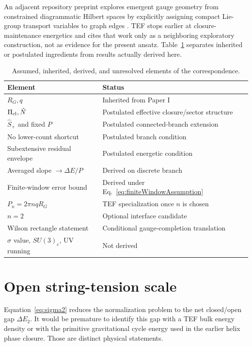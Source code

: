\documentclass[10pt]{article}
\begin{document}
An adjacent repository preprint explores emergent gauge geometry from constrained diagrammatic Hilbert spaces by explicitly assigning compact Lie-group transport variables to graph edges \cite{Arneth2026}. TEF stops earlier at closure-maintenance energetics and cites that work only as a neighboring exploratory construction, not as evidence for the present ansatz. Table~\ref{tab:status} separates inherited or postulated ingredients from results actually derived here.

\begin{table}[t]
\centering
\caption{Assumed, inherited, derived, and unresolved elements of the correspondence.}
\label{tab:status}
\begin{tabular}{@{}>{\raggedright\arraybackslash}p{}>{\raggedright\arraybackslash}p{}@{}}
\toprule
Element & Status \\
\midrule
$R_G,q$ & Inherited from Paper I \\
$\Pi_{\rm cl},\hat N$ & Postulated effective closure/sector structure \\
$\hat S_+$ and fixed $P$ & Postulated connected-branch extension \\
No lower-count shortcut & Postulated branch condition \\
Subextensive residual envelope & Postulated energetic condition \\
Averaged slope $\to\Delta E/P$ & Derived on discrete branch \\
Finite-window error bound & Derived under Eq.~\eqref{eq:finiteWindowAssumption} \\
$P_n=2\pi nqR_G$ & TEF specialization once $n$ is chosen \\
$n=2$ & Optional interface candidate \\
Wilson rectangle statement & Conditional gauge-completion translation \\
$\sigma$ value, $SU(3)_c$, UV running & Not derived \\
\bottomrule
\end{tabular}
\end{table}

\section{Open string-tension scale}
\label{sec:sigma}

Equation~\eqref{eq:sigma2} reduces the normalization problem to the net closed/open gap $\Delta E_2$.  It would be premature to identify this gap with a TEF bulk energy density or with the primitive gravitational cycle energy used in the earlier helix phase closure.  Those are distinct physical statements.
\end{document}
